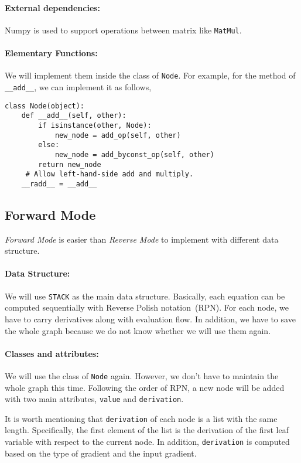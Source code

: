 \paragraph{External dependencies:} Numpy is used to support operations between matrix like \texttt{MatMul}. 
\paragraph{Elementary Functions:} We will implement them inside the class of \texttt{Node}. For example, for the method of \texttt{__add__}, we can implement it as follows,
\begin{verbatim}
class Node(object):
    def __add__(self, other):
        if isinstance(other, Node):
            new_node = add_op(self, other)
        else:
            new_node = add_byconst_op(self, other)
        return new_node
     # Allow left-hand-side add and multiply.
    __radd__ = __add__
\end{verbatim}

\subsection{Forward Mode}
\textit{Forward Mode} is easier than \textit{Reverse Mode} to implement with different data structure. 
\paragraph{Data Structure:}We will use \texttt{STACK} as the main data structure. Basically, each equation can be computed sequentially with Reverse Polish notation~(RPN). For each node, we have to carry derivatives along with evaluation flow. In addition, we have to save the whole graph because we do not know whether we will use them again. 
\paragraph{Classes and attributes:}We will use the class of \texttt{Node} again. However, we don't have to maintain the whole graph this time.
Following the order of RPN, a new node will be added with two main attributes, \texttt{value} and \texttt{derivation}. 

It is worth mentioning that \texttt{derivation} of each node is a list with the same length. Specifically, the first element of the list is the derivation of the first leaf variable with respect to the current node. In addition, \texttt{derivation} is computed based on the type of gradient and the input gradient. 


